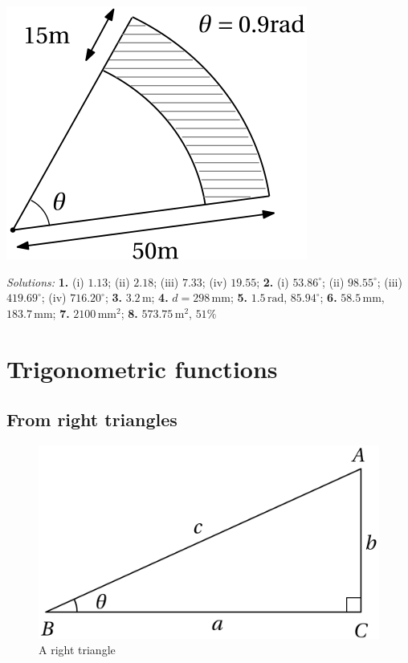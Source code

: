 \documentclass[
  12pt,
  oneside]{book}
\theoremstyle{definition}
\theoremstyle{definition}
\theoremstyle{definition}
\theoremstyle{definition}
\theoremstyle{remark}
\begin{document}
\begin{center}\includegraphics{t14-arc} \end{center}

\emph{Solutions:}
\textbf{1.} (i) \(1.13\); (ii) \(2.18\); (iii) \(7.33\); (iv) \(19.55\);
\textbf{2.} (i) \(53.86^\circ\); (ii) \(98.55^\circ\); (iii) \(419.69^\circ\); (iv) \(716.20^\circ\);
\textbf{3.} \(3.2\,\mathrm{m}\);
\textbf{4.} \(d=298\,\mathrm{mm}\);
\textbf{5.} \(1.5\,\mathrm{rad}\), \(85.94^\circ\);
\textbf{6.} \(58.5\,\mathrm{mm}\), \(183.7\,\mathrm{mm}\);
\textbf{7.} \(2100\,\mathrm{mm}^2\);
\textbf{8.} \(573.75\,\mathrm{m}^2\), \(51\%\)

\hypertarget{trigonometric-functions}{%
\chapter{Trigonometric functions}\label{trigonometric-functions}}

\hypertarget{from-right-triangles}{%
\section{From right triangles}\label{from-right-triangles}}

\begin{figure}

{\centering \includegraphics{t15-rtriangle1} 

}

\caption{A right triangle}\label{fig:unnamed-chunk-60}
\end{figure}
\end{document}
